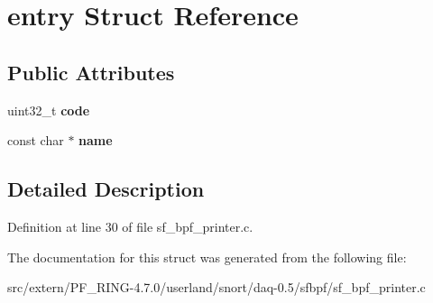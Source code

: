 \hypertarget{structentry}{
\section{entry Struct Reference}
\label{structentry}
}
\subsection*{Public Attributes}
\begin{DoxyCompactItemize}
\item 
\hypertarget{structentry_a93d42cbd60e6e9009c38f05b13b6e860}{
uint32\_\-t {\bfseries code}}
\label{structentry_a93d42cbd60e6e9009c38f05b13b6e860}

\item 
\hypertarget{structentry_aebb0525a45ca32f4a89b9180c988edb4}{
const char $\ast$ {\bfseries name}}
\label{structentry_aebb0525a45ca32f4a89b9180c988edb4}

\end{DoxyCompactItemize}


\subsection{Detailed Description}


Definition at line 30 of file sf\_\-bpf\_\-printer.c.



The documentation for this struct was generated from the following file:\begin{DoxyCompactItemize}
\item 
src/extern/PF\_\-RING-\/4.7.0/userland/snort/daq-\/0.5/sfbpf/sf\_\-bpf\_\-printer.c\end{DoxyCompactItemize}
